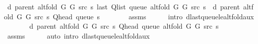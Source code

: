 \begin{isabellebody}
\ {\isachardoublequoteopen}d\ {\isacharparenleft}{\kern0pt}parent\ {\isacharparenleft}{\kern0pt}alt{\isacharunderscore}{\kern0pt}fold\ G{}\ G{}\ src\ s{\isacharparenright}{\kern0pt}{\isacharparenright}{\kern0pt}\ {\isacharparenleft}{\kern0pt}last\ {\isacharparenleft}{\kern0pt}Q{\isacharunderscore}{\kern0pt}list\ {\isacharparenleft}{\kern0pt}queue\ {\isacharparenleft}{\kern0pt}alt{\isacharunderscore}{\kern0pt}fold\ G{}\ G{}\ src\ s{\isacharparenright}{\kern0pt}{\isacharparenright}{\kern0pt}{\isacharparenright}{\kern0pt}{\isacharparenright}{\kern0pt}\ {\isasymle}\ d\ {\isacharparenleft}{\kern0pt}parent\ {\isacharparenleft}{\kern0pt}alt{\isacharunderscore}{\kern0pt}fold\ G{}\ G{}\ src\ s{\isacharparenright}{\kern0pt}{\isacharparenright}{\kern0pt}\ {\isacharparenleft}{\kern0pt}Q{\isacharunderscore}{\kern0pt}head\ {\isacharparenleft}{\kern0pt}queue\ s{\isacharparenright}{\kern0pt}{\isacharparenright}{\kern0pt}\ {\isacharplus}{\kern0pt}\ {}{\isachardoublequoteclose}\isanewline
\ \ \ \ \isamarkupfalse%
\ assms\isanewline
\ \ \ \ \isamarkupfalse%
\ {\isacharparenleft}{\kern0pt}intro\ d{\isacharunderscore}{\kern0pt}last{\isacharunderscore}{\kern0pt}queue{\isacharunderscore}{\kern0pt}le{\isacharunderscore}{\kern0pt}alt{\isacharunderscore}{\kern0pt}fold{\isacharunderscore}{\kern0pt}aux{\isacharparenright}{\kern0pt}\isanewline
\ \ \isamarkupfalse%
\ \isamarkupfalse%
\ {\isachardoublequoteopen}{\isachardot}{\kern0pt}{\isachardot}{\kern0pt}{\isachardot}{\kern0pt}\ {\isasymle}\ d\ {\isacharparenleft}{\kern0pt}parent\ {\isacharparenleft}{\kern0pt}alt{\isacharunderscore}{\kern0pt}fold\ G{}\ G{}\ src\ s{\isacharparenright}{\kern0pt}{\isacharparenright}{\kern0pt}\ {\isacharparenleft}{\kern0pt}Q{\isacharunderscore}{\kern0pt}head\ {\isacharparenleft}{\kern0pt}queue\ {\isacharparenleft}{\kern0pt}alt{\isacharunderscore}{\kern0pt}fold\ G{}\ G{}\ src\ s{\isacharparenright}{\kern0pt}{\isacharparenright}{\kern0pt}{\isacharparenright}{\kern0pt}\ {\isacharplus}{\kern0pt}\ {}{\isachardoublequoteclose}\isanewline
\ \ \ \ \isamarkupfalse%
\ assms\isanewline
\ \ \ \ \isamarkupfalse%
\ {\isacharparenleft}{\kern0pt}auto\ intro{\isacharcolon}{\kern0pt}\ d{\isacharunderscore}{\kern0pt}last{\isacharunderscore}{\kern0pt}queue{\isacharunderscore}{\kern0pt}le{\isacharunderscore}{\kern0pt}alt{\isacharunderscore}{\kern0pt}fold{\isacharunderscore}{\kern0pt}aux{\isacharunderscore}{\kern0pt}{}{\isacharparenright}{\kern0pt}\isanewline

\end{isabellebody}
